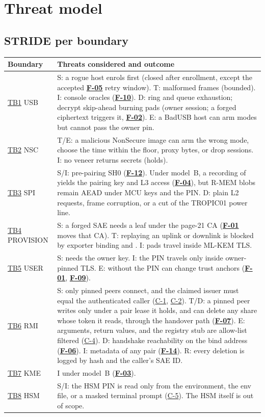 \documentclass[11pt,a4paper]{article}
\newcommand{\fid}[1]{\textbf{#1}}
\begin{document}
\section{Threat model}

\subsection{STRIDE per boundary}
\begin{longtable}{L{2.0cm}L{13.6cm}}
\toprule Boundary & Threats considered and outcome\\ \midrule\endhead
\hyperref[tb:TB1]{TB1} USB & S: a rogue host enrols first (closed after enrollment, except the accepted \hyperref[f:F-05]{\fid{F-05}} retry window). T: malformed frames (bounded). I: console oracles (\hyperref[f:F-10]{\fid{F-10}}). D: ring and queue exhaustion; decrypt skip-ahead burning pads (owner session; a forged ciphertext triggers it, \hyperref[f:F-02]{\fid{F-02}}). E: a BadUSB host can arm modes but cannot pass the owner pin.\\
\hyperref[tb:TB2]{TB2} NSC & T/E: a malicious NonSecure image can arm the wrong mode, choose the time within the floor, proxy bytes, or drop sessions. I: no veneer returns secrets (holds).\\
\hyperref[tb:TB3]{TB3} SPI & S/I: pre-pairing SH0 (\hyperref[f:F-12]{\fid{F-12}}). Under model~B, a recording of  yields the pairing key and L3 access (\hyperref[f:F-04]{\fid{F-04}}), but R-MEM blobs remain AEAD under MCU keys and the PIN. D: plain L2 requests, frame corruption, or a cut of the TROPIC01 power line.\\
\hyperref[tb:TB4]{TB4} PROVISION & S: a forged SAE needs a leaf under the page-21 CA (\hyperref[f:F-01]{\fid{F-01}} moves that CA). T: replaying an uplink or downlink is blocked by exporter binding and . I: pads travel inside ML-KEM TLS.\\
\hyperref[tb:TB5]{TB5} USER & S: needs the owner key. I: the PIN travels only inside owner-pinned TLS. E:  without the PIN can change trust anchors (\hyperref[f:F-01]{\fid{F-01}}, \hyperref[f:F-09]{\fid{F-09}}).\\
\hyperref[tb:TB6]{TB6} RMI & S: only pinned peers connect, and the claimed issuer must equal the authenticated caller (\hyperref[c:C-1]{C-1}, \hyperref[c:C-2]{C-2}). T/D: a pinned peer writes only under a pair lease it holds, and can delete any share whose token it reads, through the handover path (\hyperref[f:F-07]{\fid{F-07}}). E: arguments, return values, and the registry stub are allow-list filtered (\hyperref[c:C-4]{C-4}). D: handshake reachability on the bind address (\hyperref[f:F-06]{\fid{F-06}}). I: metadata of any pair (\hyperref[f:F-14]{\fid{F-14}}). R: every deletion is logged by hash and the caller's SAE ID.\\
\hyperref[tb:TB7]{TB7} KME & I under model~B (\hyperref[f:F-03]{\fid{F-03}}).\\
\hyperref[tb:TB8]{TB8} HSM & S/I: the HSM PIN is read only from the environment, the env file, or a masked terminal prompt (\hyperref[c:C-5]{C-5}). The HSM itself is out of scope.\\
\bottomrule
\end{longtable}
\end{document}
